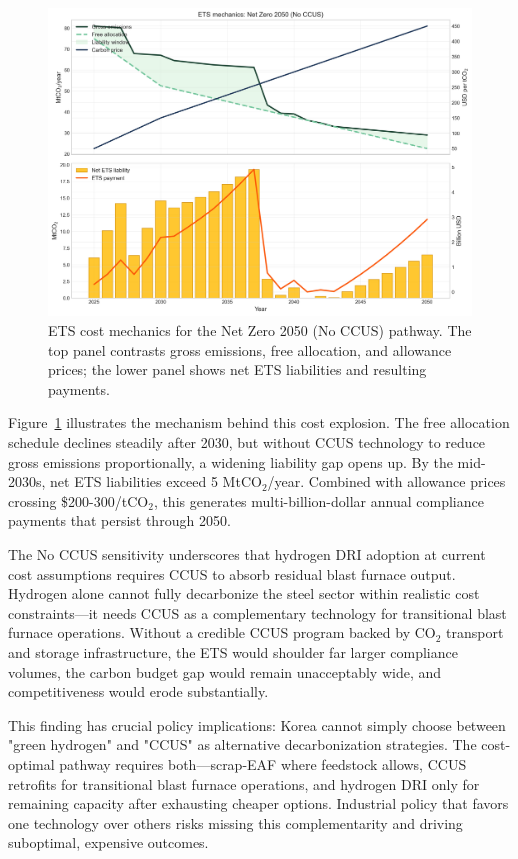 \documentclass[preprint,1p,authoryear]{elsarticle}
\begin{document}
\begin{figure}[!t]
  \centering
  \includegraphics[width=0.85\linewidth]{ets_cost_logic}
  \caption{ETS cost mechanics for the Net Zero 2050 (No CCUS) pathway. The top panel contrasts gross emissions, free allocation, and allowance prices; the lower panel shows net ETS liabilities and resulting payments.}
  \label{fig:ets-logic}
\end{figure}

Figure~\ref{fig:ets-logic} illustrates the mechanism behind this cost explosion. The free allocation schedule declines steadily after 2030, but without CCUS technology to reduce gross emissions proportionally, a widening liability gap opens up. By the mid-2030s, net ETS liabilities exceed 5 MtCO$_2$/year. Combined with allowance prices crossing \$200-300/tCO$_2$, this generates multi-billion-dollar annual compliance payments that persist through 2050.

The No CCUS sensitivity underscores that hydrogen DRI adoption at current cost assumptions requires CCUS to absorb residual blast furnace output. Hydrogen alone cannot fully decarbonize the steel sector within realistic cost constraints—it needs CCUS as a complementary technology for transitional blast furnace operations. Without a credible CCUS program backed by CO$_2$ transport and storage infrastructure, the ETS would shoulder far larger compliance volumes, the carbon budget gap would remain unacceptably wide, and competitiveness would erode substantially.

This finding has crucial policy implications: Korea cannot simply choose between "green hydrogen" and "CCUS" as alternative decarbonization strategies. The cost-optimal pathway requires both—scrap-EAF where feedstock allows, CCUS retrofits for transitional blast furnace operations, and hydrogen DRI only for remaining capacity after exhausting cheaper options. Industrial policy that favors one technology over others risks missing this complementarity and driving suboptimal, expensive outcomes.
\end{document}
